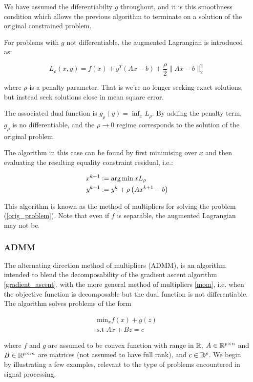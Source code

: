 \documentclass[titlepage]{article}
\begin{document}
We have assumed the diferentiabilty \(g\) throughout, and it is this smoothness condition which allows the previous algorithm to terminate on a solution of the original constrained problem.

For problems with \(g\) not differentiable, the augmented Lagrangian is introduced as:

\begin{equation}
L_\rho\left(x,y\right) = f\left( x \right) + y^T\left(Ax-b\right) + \frac{\rho}{2}\|Ax-b\|_2^2
\end{equation}

where \(\rho\) is a penalty parameter. That is we're no longer seeking exact solutions, but instead seek solutions close in mean square error. 

The associated dual function is \(g_\rho\left(y\right) = \inf_x L_\rho\). By adding the penalty term, \(g_\rho\) is no differentiable, and the \(\rho \rightarrow 0\) regime corresponds to the solution of the original problem. 

The algorithm in this case can be found by first minimising over \(x\) and then evaluating the resulting equality constraint residual, i.e.:

\begin{align}
x^{k+1} &:= \operatorname*{arg\,min}{x} L_\rho \\
y^{k+1} &:= y^{k} + \rho \left(Ax^{k+1} - b\right)
\label{mom}
\end{align}

This algorithm is known as the method of multipliers for solving the problem (\ref{orig_problem}). Note that even if \(f\) is separable, the augmented Lagrangian may not be.

\subsubsection{ADMM}
The alternating direction method of multipliers (ADMM), is an algorithm intended to blend the decomposability of the gradient ascent algorithm \ref{gradient_ascent}, with the more general method of multipliers \ref{mom}, i.e. when the objective function is decomposable but the dual function is not differentiable. The algorithm solves problems of the form

\begin{align}
\text{min}_{x} f\left( x \right) + g\left(z\right)
\\
\text{s.t } Ax +Bz = c
\label{admm}
\end{align}

where \(f\) and \(g\) are assumed to be convex function with range in \({\mathbb{R}}\), \(A \in {\mathbb{R}}^{p \times n}\) and \(B\in {\mathbb{R}}^{p \times m}\) are matrices (not assumed to have full rank), and \(c \in {\mathbb{R}}^p\). We begin by illustrating a few examples, relevant to the type of problems encountered in signal processing.
\end{document}
